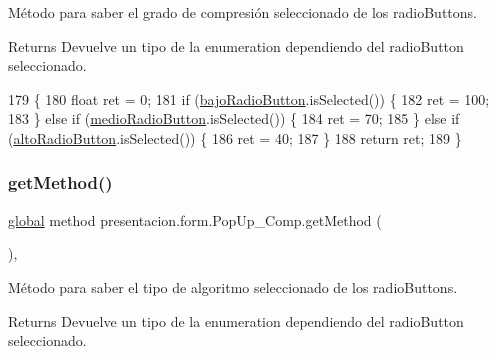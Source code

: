 Método para saber el grado de compresión seleccionado de los radio\+Button\textquotesingle{}s. 

\begin{DoxyReturn}{Returns}
Devuelve un tipo de la enumeration dependiendo del radio\+Button seleccionado. 
\end{DoxyReturn}

\begin{DoxyCode}
179                        \{
180         \textcolor{keywordtype}{float} ret = 0;
181         \textcolor{keywordflow}{if} (\hyperlink{classpresentacion_1_1form_1_1PopUp__Comp_add9532658d448dcbfa9b7dd40ddc8b38}{bajoRadioButton}.isSelected()) \{
182             ret = 100;
183         \} \textcolor{keywordflow}{else} \textcolor{keywordflow}{if} (\hyperlink{classpresentacion_1_1form_1_1PopUp__Comp_ad1daa09264648f37642b24a698e32206}{medioRadioButton}.isSelected()) \{
184             ret = 70;
185         \} \textcolor{keywordflow}{else} \textcolor{keywordflow}{if} (\hyperlink{classpresentacion_1_1form_1_1PopUp__Comp_a9f49f4c6ce6d4f60a7015d8699aef151}{altoRadioButton}.isSelected()) \{
186             ret = 40;
187         \}
188         \textcolor{keywordflow}{return} ret;
189     \}
\end{DoxyCode}
\mbox{\label{classpresentacion_1_1form_1_1PopUp__Comp_ab63511cd207f6a9f6e4f8b52f0b66523}} 
\subsubsection{\texorpdfstring{get\+Method()}{getMethod()}}
{\footnotesize\ttfamily \hyperlink{classglobal_1_1global}{global} method presentacion.\+form.\+Pop\+Up\+\_\+\+Comp.\+get\+Method (\begin{DoxyParamCaption}{ }\end{DoxyParamCaption})\hspace{0.3cm}{\ttfamily [inline]}, {\ttfamily [package]}}



Método para saber el tipo de algoritmo seleccionado de los radio\+Button\textquotesingle{}s. 

\begin{DoxyReturn}{Returns}
Devuelve un tipo de la enumeration dependiendo del radio\+Button seleccionado. 
\end{DoxyReturn}

